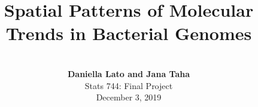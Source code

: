 \documentclass{beamer}
\title{\Huge Spatial Patterns of Molecular Trends in Bacterial Genomes}
\author[Daniella Lato]{\\ \textbf{Daniella Lato and Jana Taha}\\ Stats 744: Final Project\\ December 3, 2019}
\date[2017]{}
\newcommand\FourQuad[4]{%
	\begin{minipage}[b][.35\textheight][t]{.47\textwidth}#1\end{minipage}\hfill%
	\begin{minipage}[b][.35\textheight][t]{.47\textwidth}#2\end{minipage}\\[0.5em]
	\begin{minipage}[b][.35\textheight][t]{.47\textwidth}#3\end{minipage}\hfill
	\begin{minipage}[b][.35\textheight][t]{.47\textwidth}#4\end{minipage}%
}
\begin{document}
	\begin{frame}
		
		\titlepage
		
	\end{frame}
	
	
%
%		
%
%
%		
%
\end{document}
